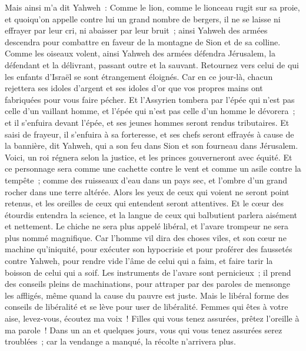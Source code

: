 \begin{multicols}{2}
Mais ainsi m'a dit Yahweh~: Comme le lion, comme le lionceau rugit sur sa proie, et quoiqu'on appelle contre lui un grand nombre de bergers, il ne se laisse ni effrayer par leur cri, ni abaisser par leur bruit~; ainsi Yahweh des armées descendra pour combattre en faveur de la montagne de Sion et de sa colline.
Comme les oiseaux volent, ainsi Yahweh des armées défendra Jérusalem, la défendant et la délivrant, passant outre et la sauvant.
Retournez vers celui de qui les enfants d'Israël se sont étrangement éloignés.
Car en ce jour-là, chacun rejettera ses idoles d'argent et ses idoles d'or que vos propres mains ont fabriquées pour vous faire pécher.
Et l'Assyrien tombera par l'épée qui n'est pas celle d'un vaillant homme, et l'épée qui n'est pas celle d'un homme le dévorera~; et il s'enfuira devant l'épée, et ses jeunes hommes seront rendus tributaires.
Et saisi de frayeur, il s'enfuira à sa forteresse, et ses chefs seront effrayés à cause de la bannière, dit Yahweh, qui a son feu dans Sion et son fourneau dans Jérusalem.
\VerseOne{}Voici, un roi régnera selon la justice, et les princes gouverneront avec équité.
Et ce personnage sera comme une cachette contre le vent et comme un asile contre la tempête~; comme des ruisseaux d'eau dans un pays sec, et l'ombre d'un grand rocher dans une terre altérée.
Alors les yeux de ceux qui voient ne seront point retenus, et les oreilles de ceux qui entendent seront attentives.
Et le cœur des étourdis entendra la science, et la langue de ceux qui balbutient parlera aisément et nettement.
Le chiche ne sera plus appelé libéral, et l'avare trompeur ne sera plus nommé magnifique.
Car l'homme vil dira des choses viles, et son cœur ne machine qu'iniquité, pour exécuter son hypocrisie et pour proférer des faussetés contre Yahweh, pour rendre vide l'âme de celui qui a faim, et faire tarir la boisson de celui qui a soif.
Les instruments de l'avare sont pernicieux~; il prend des conseils pleins de machinations, pour attraper par des paroles de mensonge les affligés, même quand la cause du pauvre est juste.
Mais le libéral forme des conseils de libéralité et se lève pour user de libéralité.
Femmes qui êtes à votre aise, levez-vous, écoutez ma voix~! Filles qui vous tenez assurées, prêtez l'oreille à ma parole~!
Dans un an et quelques jours, vous qui vous tenez assurées serez troublées~; car la vendange a manqué, la récolte n'arrivera plus.

\end{multicols}
